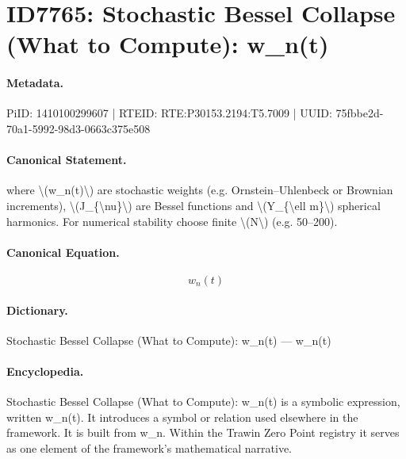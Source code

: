 \section*{ID7765: Stochastic Bessel Collapse (What to Compute): w\_n(t)}
\paragraph{Metadata.}
PiID: 1410100299607 | RTEID: RTE:P30153.2194:T5.7009 | UUID: 75fbbe2d-70a1-5992-98d3-0663c375e508

\paragraph{Canonical Statement.}
where \textbackslash{}(w\_n(t)\textbackslash{}) are stochastic weights (e.g. Ornstein–Uhlenbeck or Brownian increments), \textbackslash{}(J\_\{\textbackslash{}nu\}\textbackslash{}) are Bessel functions and \textbackslash{}(Y\_\{\textbackslash{}ell m\}\textbackslash{}) spherical harmonics. For numerical stability choose finite \textbackslash{}(N\textbackslash{}) (e.g. 50–200).

\paragraph{Canonical Equation.}
\[
w_n(t)
\]

\paragraph{Dictionary.}
Stochastic Bessel Collapse (What to Compute): w\_n(t) — w\_n(t)

\paragraph{Encyclopedia.}
Stochastic Bessel Collapse (What to Compute): w\_n(t) is a symbolic expression, written w\_n(t). It introduces a symbol or relation used elsewhere in the framework. It is built from w\_n. Within the Trawin Zero Point registry it serves as one element of the framework's mathematical narrative.
